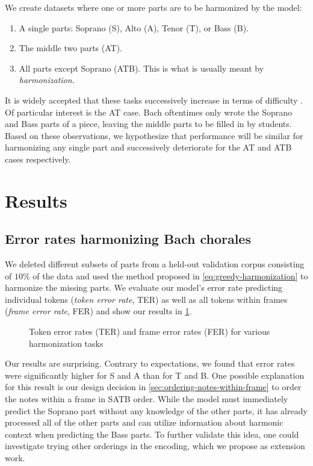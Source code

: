 We create datasets where one or more parts are to be harmonized by the model:
\begin{enumerate}
  \item A single parts: Soprano (S), Alto (A), Tenor (T), or Bass (B).
  \item The middle two parts (AT).
  \item All parts except Soprano (ATB). This is what is usually meant by \emph{harmonization}.
\end{enumerate}
It is widely accepted that these tasks successively increase in terms of
difficulty \citep{denny1960oxford}. Of particular interest is the AT case.
Bach oftentimes only wrote the Soprano and Bass parts of a piece, leaving the
middle parts to be filled in by students. Based on these observations, we
hypothesize that performance will be similar for harmonizing any single part
and successively deteriorate for the AT and ATB cases respectively.

\section{Results}
\label{sec:harmonization-results}


\subsection{Error rates harmonizing Bach chorales}

We deleted different subsets of parts from a held-out validation corpus
consisting of $10\%$ of the data and used the method proposed in
\cref{eq:greedy-harmonization} to harmonize the missing parts. We evaluate
our model's error rate predicting individual tokens (\emph{token error rate}, TER)
as well as all tokens within frames (\emph{frame error rate}, FER) and show
our results in \cref{fig:harmonization-results}.

\begin{figure}[tb]
  \centering
  
  \caption{Token error rates (TER) and frame error rates (FER) for various harmonization tasks}
  \label{fig:harmonization-results}
\end{figure}

Our results are surprising. Contrary to expectations, we found that error rates
were significantly higher for S and A than for T and B. One possible
explanation for this result is our design decision in
\vref{sec:ordering-notes-within-frame} to order the notes within a frame in
SATB order. While the model must immediately predict the Soprano part without
any knowledge of the other parts, it has already processed all of the other
parts and can utilize information about harmonic context when predicting the
Bass parts. To further validate this idea, one could investigate trying other
orderings in the encoding, which we propose as extension work.

